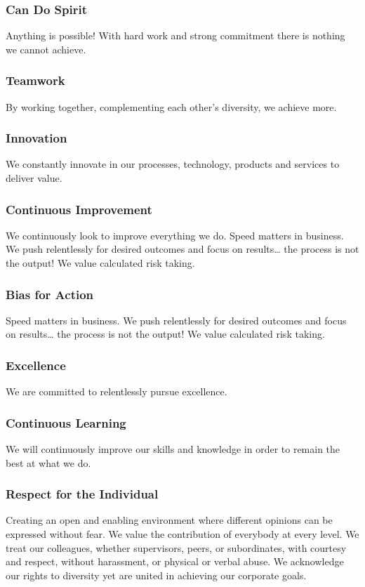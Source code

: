 \subsubsection{Can Do Spirit} Anything is possible! With hard work and strong commitment there is   nothing we cannot achieve.
\subsubsection{Teamwork} By working together, complementing each other’s diversity, we achieve more.
\subsubsection{Innovation} We constantly innovate in our processes, technology, products and services to deliver value.
\subsubsection{Continuous Improvement} We continuously look to improve everything we do. Speed matters in business. We push relentlessly for desired outcomes and focus on results… the process is not the output! We value calculated risk taking.
\subsubsection{Bias for Action} Speed matters in business. We push relentlessly for desired outcomes and focus on results… the process is not the output! We value calculated risk taking.
\subsubsection{Excellence} We are committed to relentlessly pursue excellence.
\subsubsection{Continuous Learning} We will continuously improve our skills and knowledge in order to remain the best at what we do.
\subsubsection{Respect for the Individual} Creating an open and enabling environment where different opinions can be expressed without fear. We value the   contribution of everybody at every level. We treat our colleagues, whether supervisors, peers, or subordinates, with courtesy and respect, without harassment, or physical or verbal abuse. We acknowledge our rights to diversity yet are united in achieving our corporate goals.
